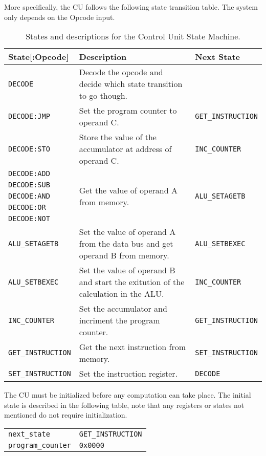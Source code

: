 \documentclass[a4paper]{article}
\begin{document}
More specifically, the CU follows the following state transition table. The system only depends on the Opcode input.

\begin{table}[H]
\centering
\caption{States and descriptions for the Control Unit State Machine.}
\begin{tabular}{p{} p{} p{}}
    State[:Opcode] & Description & Next State \\
    \hline\hline
    \verb|DECODE| & Decode the opcode and decide which state transition to go though. \\
    \verb|DECODE:JMP| & Set the program counter to operand C. & \verb|GET_INSTRUCTION| \\
    \verb|DECODE:STO| & Store the value of the accumulator at address of operand C. & \verb|INC_COUNTER| \\
    \verb|DECODE:ADD| & \multirow{5}{*}{Get the value of operand A from memory.} & \multirow{5}{*}{\texttt{ALU\_SETAGETB}} \\
    \verb|DECODE:SUB| &  & \\
    \verb|DECODE:AND| &  & \\
    \verb|DECODE:OR| &  & \\
    \verb|DECODE:NOT| &  & \\
    \hline
    \verb|ALU_SETAGETB| & Set the value of operand A from the data bus and get operand B from memory. & \verb|ALU_SETBEXEC| \\
    \hline
    \verb|ALU_SETBEXEC| & Set the value of operand B and start the exitution of the calculation in the ALU. & \verb|INC_COUNTER| \\
    \hline
    \verb|INC_COUNTER| & Set the accumulator and incriment the program counter. & \verb|GET_INSTRUCTION| \\
    \hline
    \verb|GET_INSTRUCTION| & Get the next instruction from memory. & \verb|SET_INSTRUCTION| \\
    \hline
    \verb|SET_INSTRUCTION| & Set the instruction register. & \verb|DECODE| \\
\end{tabular}
\end{table}

The CU must be initialized before any computation can take place. The initial state is described in the following table, note that any registers or states not mentioned do not require initialization.

\begin{table}[H]
\centering
\begin{tabular}{ll}
    \verb|next_state| & \verb|GET_INSTRUCTION| \\
    \verb|program_counter| & \verb|0x0000|
\end{tabular}
\end{table}
\end{document}
